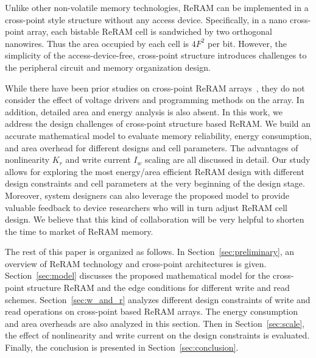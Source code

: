 Unlike other non-volatile memory technologies, ReRAM can be implemented in
a cross-point style structure without any access device. Specifically, in
a nano cross-point array, each bistable ReRAM cell is sandwiched by two
orthogonal nanowires. Thus the area occupied by each cell is $4F^2$ per
bit. However, the simplicity of the access-device-free, cross-point
structure introduces challenges to the peripheral circuit and memory
organization design.

While there have been prior studies on cross-point ReRAM
arrays~\cite{crossbar_NANO2002_Ziegler,crossbar_NANO08_Flocke,crossbar_TED_2010,crossbar_NANO2003_Ziegler},
they do not consider the effect of voltage drivers and programming methods
on the array. In addition, detailed area and energy analysis is also
absent. In this work, we address the design challenges of cross-point
structure based ReRAM. We build an accurate mathematical model to evaluate
memory reliability, energy consumption, and area overhead for different
designs and cell parameters. The advantages of nonlinearity $K_r$ and
write current $I_w$ scaling are all discussed in detail. Our study allows
for exploring the most energy/area efficient ReRAM design with different
design constraints and cell parameters at the very beginning of the design
stage. Moreover, system designers can also leverage the proposed
model to provide valuable feedback to device researchers who will in turn
adjust ReRAM cell design. We believe that this kind of collaboration will
be very helpful to shorten the time to market of ReRAM memory.

The rest of this paper is organized as follows. In
Section~\ref{sec:preliminary}, an overview of ReRAM technology and
cross-point architectures is given. Section~\ref{sec:model} discusses the
proposed mathematical model for the cross-point structure ReRAM and the
edge conditions for different write and read schemes.
Section~\ref{sec:w_and_r} analyzes different design constraints of write
and read operations on cross-point based ReRAM arrays. The energy
consumption and area overheads are also analyzed in this section. Then in
Section~\ref{sec:scale}, the effect of nonlinearity and write current on
the design constraints is evaluated. Finally, the conclusion is presented
in Section~\ref{sec:conclusion}.
